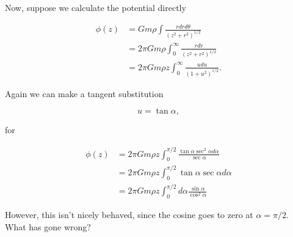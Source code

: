 Now, suppose we calculate the potential directly

\begin{align*}
\phi(z)
&= G m \rho \int \frac{r dr d\theta}{(z^2 + r^2)^{1/2}} \\
&= 2 \pi G m \rho \int_0^\infty \frac{r dr }{(z^2 + r^2)^{1/2}} \\
&= 2 \pi G m \rho z \int_0^\infty \frac{u du }{(1 + u^2)^{1/2}}.
\end{align*}

Again we can make a tangent substitution 

\begin{equation}\label{eqn:classicalMechanicsPs2:n}
u = \tan\alpha,
\end{equation}

for

\begin{align*}
\phi(z)
&= 2 \pi G m \rho z \int_0^{\pi/2} \frac{\tan \alpha \sec^2 \alpha d \alpha }{\sec\alpha} \\
&= 2 \pi G m \rho z \int_0^{\pi/2} \tan \alpha \sec \alpha d \alpha \\
&= 2 \pi G m \rho z \int_0^{\pi/2} d\alpha \frac{\sin \alpha}{\cos^2 \alpha}
\end{align*}

However, this isn't nicely behaved, since the cosine goes to zero at $\alpha = \pi/2$.  What has gone wrong?

\EndNoBibArticle
